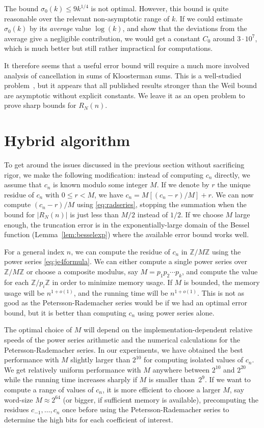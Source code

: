 \documentclass{amsart}
\theoremstyle{definition}
\theoremstyle{remark}
\begin{document}
The bound $\sigma_0(k) \le 9k^{1/4}$ is not optimal.
However, this bound is quite reasonable over the relevant non-asymptotic range of $k$.
If we could estimate $\sigma_0(k)$ by its \emph{average}
value $\log(k)$, and show that the deviations
from the average give a negligible contribution,
we would get a constant $C_0$ around
$3 \cdot 10^7$, which is much better but still rather impractical
for computations.

It therefore seems that a useful error bound
will require a much more involved analysis of cancellation in
sums of Kloosterman sums.
This is a well-studied problem~\cite{sarnak2009linnik},
but it appears that all published results stronger than
the Weil bound
are asymptotic without explicit constants.
We leave it as an open problem to prove sharp bounds for $R_N(n)$.

\section{Hybrid algorithm}

To get around the issues discussed in the previous
section without sacrificing rigor, we make the following
modification: instead of computing $c_n$ directly,
we assume that $c_n$ is known modulo some integer $M$.
If we denote by $r$ the unique residue of $c_n$ with $0 \le r < M$,
we have $c_n = M [(c_n - r)/M] + r$.
We can now compute $(c_n - r) / M$ using \eqref{eq:radseries},
stopping the summation when the bound for $|R_N(n)|$ is just less than
$M/2$ instead of $1/2$.
If we choose $M$ large enough,
the truncation error is in the exponentially-large domain of the Bessel function (Lemma~\ref{lem:besselexp})
where the available error bound works well.

For a general index $n$, we can compute the residue of $c_n$ in $\mathbb{Z}/M\mathbb{Z}$
using the power series \eqref{eq:je4formula}.
We can either compute a single power series over $\mathbb{Z}/M\mathbb{Z}$
or choose a composite modulus, say $M = p_1 p_2 \cdots p_k$,
and compute the value for each $\mathbb{Z}/p_i\mathbb{Z}$
in order to minimize memory usage.
If $M$ is bounded, the memory usage will be $n^{1+o(1)}$,
and the running time will be $n^{1+o(1)}$.
This is not as good as the Petersson-Rademacher series would be if we had
an optimal error bound, but it is better than computing $c_n$ using
power series alone.

The optimal choice of $M$ will depend on the
implementation-dependent
relative speeds of the power series arithmetic
and the numerical calculations for the Petersson-Rademacher series.
In our experiments, we have obtained the best performance
with $M$ slightly larger than $2^{10}$ for computing isolated values of $c_n$.
We get relatively uniform performance with $M$ anywhere between $2^{10}$
and $2^{20}$ while the running time increases sharply if $M$
is smaller than~$2^{9}$.
If we want to compute a range of values of $c_n$, it is more
efficient to choose a larger $M$, say word-size $M \approx 2^{64}$ (or bigger,
if sufficient memory is available),
precomputing the residues $c_{-1},\ldots,c_n$ once
before using the Petersson-Rademacher series to determine the high bits for each coefficient of interest.
\end{document}
